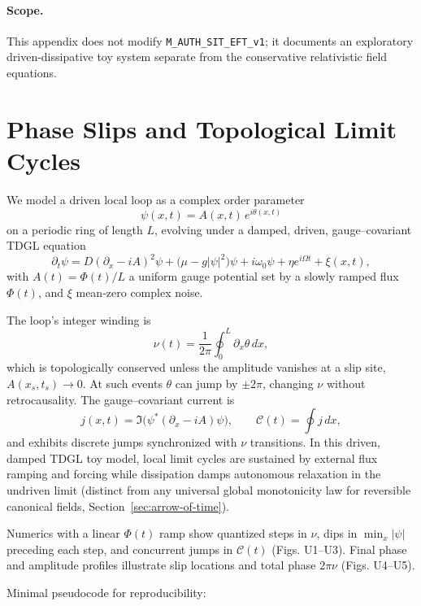 \paragraph{Scope.} This appendix does not modify \texttt{M\_AUTH\_SIT\_EFT\_v1}; it documents an exploratory driven-dissipative toy system separate from the conservative relativistic field equations.

\section{Phase Slips and Topological Limit Cycles}

We model a driven local loop as a complex order parameter
\[
\psi(x,t)=A(x,t)\,e^{i\theta(x,t)}
\]
on a periodic ring of length \(L\), evolving under a damped, driven, gauge--covariant TDGL equation
\[
\partial_t \psi
= D(\partial_x - iA)^2 \psi + \big(\mu - g|\psi|^2\big)\psi
+ i\omega_0 \psi + \eta e^{i\Omega t} + \xi(x,t),
\]
with \(A(t)=\Phi(t)/L\) a uniform gauge potential set by a slowly ramped flux \(\Phi(t)\), and \(\xi\) mean-zero complex noise.

The loop's integer winding is
\[
\nu(t)=\frac{1}{2\pi}\oint_0^L \partial_x \theta\,dx,
\]
which is topologically conserved unless the amplitude vanishes at a slip site, \(A(x_s,t_s)\to 0\). At such events \(\theta\) can jump by \(\pm 2\pi\), changing \(\nu\) without retrocausality. The gauge--covariant current is
\[
j(x,t)=\Im\!\Big(\psi^*(\partial_x - iA)\psi\Big), \qquad
\mathcal{C}(t)=\oint j\,dx,
\]
and exhibits discrete jumps synchronized with \(\nu\) transitions. In this driven, damped TDGL toy model, local limit cycles are sustained by external flux ramping and forcing while dissipation damps autonomous relaxation in the undriven limit (distinct from any universal global monotonicity law for reversible canonical fields, Section~\ref{sec:arrow-of-time}).

Numerics with a linear \(\Phi(t)\) ramp show quantized steps in \(\nu\), dips in \(\min_x|\psi|\) preceding each step, and concurrent jumps in \(\mathcal{C}(t)\) (Figs. U1--U3). Final phase and amplitude profiles illustrate slip locations and total phase \(2\pi\nu\) (Figs. U4--U5).

Minimal pseudocode for reproducibility:

